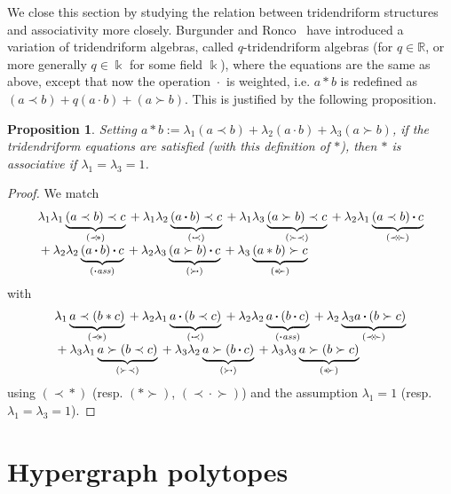 \documentclass[11pt]{article}
\newtheorem{proposition}[theo]{Proposition}
\theoremstyle{definition}
\numberwithin{equation}{section}
\numberwithin{equation}{section}
\newcommand{\bcdot}{\,{\bm \cdot}\,}
\newcommand{\precstar}{\prec\!\ast}
\newcommand{\astsucc}{\ast\!\succ}
\newcommand{\bcdotass}{\!\bcdot \!{\it ass}}
\newcommand{\succbcdot}{\succ\!\!\bcdot\!}
\newcommand{\bcdotprec}{\!\bcdot\!\!\prec}
\newcommand{\precbcdotsucc}{\prec\!\!\bcdot\!\!\succ}
\begin{document}
We close this section by studying the relation between tridendriform structures and associativity more closely.  Burgunder and Ronco~\cite{BR} have introduced a variation of tridendriform algebras, called $q$-tridendriform  algebras (for $q\in \mathbb{R}$, or more generally $q\in {\Bbbk}$ for some field ${\Bbbk}$), where the equations are the same as above, except that now the operation $\bcdot$ is weighted, i.e. $a\ast b$ is redefined as $(a\prec b)+q(a\bcdot b)+(a\succ b)$. This is justified by the following proposition.
\begin{proposition} \label{tridend-implies-ass}
Setting $a\ast b:=\lambda_1(a\prec b)+\lambda_2(a\bcdot b)+\lambda_3(a\succ b)$, if the tridendriform equations are satisfied (with this definition of $\ast$), then $\ast$ is associative if  $\lambda_1=\lambda_3=1$.
\end{proposition} 
\begin{proof} We match
 $$\begin{array}{ll}
 \lambda_1\lambda_1 \underbrace{ (a\prec b)\prec c}_{(\precstar)} \:+\: \lambda_1\lambda_2\underbrace{(a\bcdot b)\prec c}_{(\bcdotprec)} \:+\: \lambda_1\lambda_3 
\underbrace{(a\succ b)\prec c}_{(\succ\prec)}  \:+\: \lambda_2\lambda_1 \underbrace{(a\prec b)\bcdot c}_{(\precbcdotsucc)} \\
 \:+\: \lambda_2\lambda_2 \underbrace{(a\bcdot b)\bcdot c}_{(\bcdotass)}
\:+\: \lambda_2\lambda_3 \underbrace{(a\succ b)\bcdot c}_{(\succbcdot)}  \:+\: \lambda_3\underbrace{ (a\ast b)\succ c}_{(\astsucc)}
 \end{array}$$
 with
 $$\begin{array}{ll}
 \lambda_1 \underbrace{a\prec (b\ast c)}_{(\precstar)}  \:+\:
\lambda_2 \lambda_1 \underbrace{ a\bcdot (b\prec c)}_{(\bcdotprec)} \:+\: \lambda_2\lambda_2 \underbrace{a\bcdot (b\bcdot c)}_{(\bcdotass)}  \:+\: \lambda_2\underbrace{\lambda_3 a\bcdot (b\succ c)}_{(\precbcdotsucc)} \\ 
 \:+\: \lambda_3\lambda_1 \underbrace{a\succ(b\prec c)}_{(\succ\prec)} \:+\: \lambda_3\lambda_2 \underbrace{a\succ(b\bcdot c)}_{(\succbcdot)} \:+\:
\lambda_3\lambda_3 \underbrace{a\succ(b\succ c)}_{(\astsucc)}
\end{array}$$
 using $(\precstar)$ (resp. $(\astsucc)$, $(\precbcdotsucc)$) and the assumption $\lambda_1=1$ (resp.  $\lambda_1 = \lambda_3=1$).
\end{proof}
\section{Hypergraph polytopes} \label{reminders-hypergraph-section}
\end{document}
